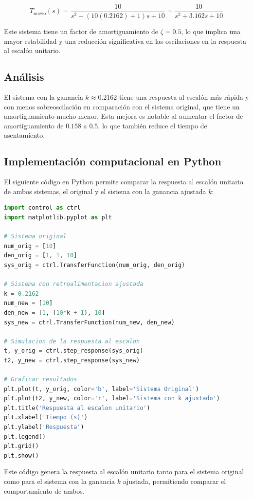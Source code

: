 \documentclass[10pt]{article}
\theoremstyle{definition}
\theoremstyle{remark}
\theoremstyle{definition}
\numberwithin{equation}{prob}
\begin{document}
\[
	T_{\text{nuevo}}(s) = \frac{10}{s^2 + (10(0.2162) + 1)s + 10} = \frac{10}{s^2 + 3.162s + 10}
\]

Este sistema tiene un factor de amortiguamiento de \( \zeta = 0.5 \), lo que implica una mayor estabilidad y una reducción significativa en las oscilaciones en la respuesta al escalón unitario.

\subsection*{Análisis}

El sistema con la ganancia \( k \approx 0.2162 \) tiene una respuesta al escalón más rápida y con menos sobreoscilación en comparación con el sistema original, que tiene un amortiguamiento mucho menor. Esta mejora es notable al aumentar el factor de amortiguamiento de \( 0.158 \) a \( 0.5 \), lo que también reduce el tiempo de asentamiento.

\subsection*{Implementación computacional en Python}

El siguiente código en Python permite comparar la respuesta al escalón unitario de ambos sistemas, el original y el sistema con la ganancia ajustada \( k \):

\begin{lstlisting}[language=Python]
import control as ctrl
import matplotlib.pyplot as plt

# Sistema original
num_orig = [10]
den_orig = [1, 1, 10]
sys_orig = ctrl.TransferFunction(num_orig, den_orig)

# Sistema con retroalimentacion ajustada
k = 0.2162
num_new = [10]
den_new = [1, (10*k + 1), 10]
sys_new = ctrl.TransferFunction(num_new, den_new)

# Simulacion de la respuesta al escalon
t, y_orig = ctrl.step_response(sys_orig)
t2, y_new = ctrl.step_response(sys_new)

# Graficar resultados
plt.plot(t, y_orig, color='b', label='Sistema Original')
plt.plot(t2, y_new, color='r', label='Sistema con k ajustado')
plt.title('Respuesta al escalon unitario')
plt.xlabel('Tiempo (s)')
plt.ylabel('Respuesta')
plt.legend()
plt.grid()
plt.show()
\end{lstlisting}

Este código genera la respuesta al escalón unitario tanto para el sistema original como para el sistema con la ganancia \( k \) ajustada, permitiendo comparar el comportamiento de ambos.
\end{document}
